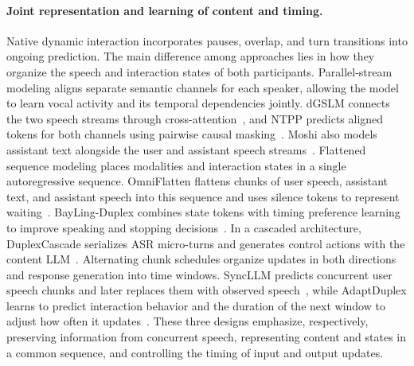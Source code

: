 \paragraph{Joint representation and learning of content and timing.}
Native dynamic interaction incorporates pauses, overlap, and turn transitions into ongoing prediction. The main difference among approaches lies in how they organize the speech and interaction states of both participants. Parallel-stream modeling aligns separate semantic channels for each speaker, allowing the model to learn vocal activity and its temporal dependencies jointly. dGSLM connects the two speech streams through cross-attention~\citep{DBLP:journals/tacl/NguyenKCAHETASM23}, and NTPP predicts aligned tokens for both channels using pairwise causal masking~\citep{DBLP:journals/corr/abs-2506-00975}. Moshi also models assistant text alongside the user and assistant speech streams~\citep{DBLP:journals/corr/abs-2410-00037}. Flattened sequence modeling places modalities and interaction states in a single autoregressive sequence. OmniFlatten flattens chunks of user speech, assistant text, and assistant speech into this sequence and uses silence tokens to represent waiting~\citep{DBLP:conf/acl/ZhangCDCWZLYTDZ25}. BayLing-Duplex combines state tokens with timing preference learning to improve speaking and stopping decisions~\citep{DBLP:journals/corr/abs-2606-14528}. In a cascaded architecture, DuplexCascade serializes ASR micro-turns and generates control actions with the content LLM~\citep{DBLP:journals/corr/abs-2603-09180}. Alternating chunk schedules organize updates in both directions and response generation into time windows. SyncLLM predicts concurrent user speech chunks and later replaces them with observed speech~\citep{DBLP:conf/emnlp/VeluriPYGG24}, while AdaptDuplex learns to predict interaction behavior and the duration of the next window to adjust how often it updates~\citep{DBLP:journals/corr/abs-2609-29217}. These three designs emphasize, respectively, preserving information from concurrent speech, representing content and states in a common sequence, and controlling the timing of input and output updates.



